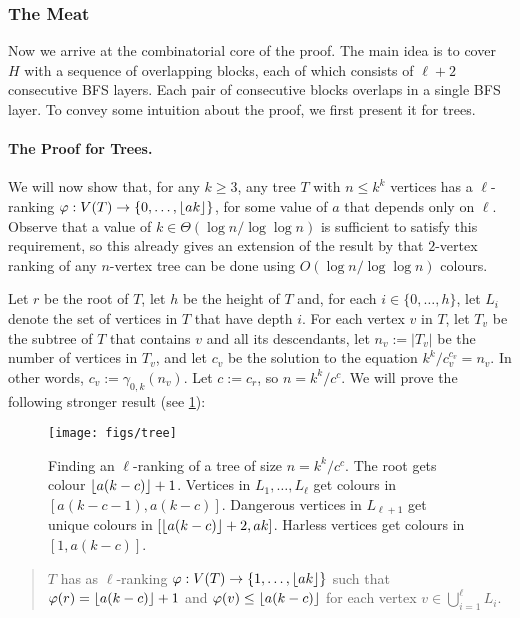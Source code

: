 \documentclass[kpfonts]{patmorin}
\theoremstyle{named}
\begin{document}
\subsubsection{The Meat}

Now we arrive at the combinatorial core of the proof. The main idea is to cover $H$ with a sequence of overlapping blocks, each of which consists of $\ell+2$ consecutive BFS layers.  Each pair of consecutive blocks overlaps in a single BFS layer. To convey some intuition about the proof, we first present it for trees.

\paragraph{The Proof for Trees.}

We will now show that, for any $k\ge 3$, any tree $T$ with $n \le k^k$ vertices has a $\ell$-ranking $\varphi:V(T)\to\{0,\ldots,{\lfloor ak \rfloor}\}$, for some value of $a$ that depends only on $\ell$.  Observe that a value of $k\in\Theta(\log n/\log\log n)$ is sufficient to satisfy this requirement, so this already gives an extension of the result by \citet{karpas.neiman.ea:on} that $2$-vertex ranking of any $n$-vertex tree can be done using $O(\log n/\log\log n)$ colours.

Let $r$ be the root of $T$, let $h$ be the height of $T$ and, for each $i\in\{0,\ldots,h\}$, let $L_i$ denote the set of vertices in $T$ that have depth $i$.  For each vertex $v$ in $T$, let $T_v$ be the subtree of $T$ that contains $v$ and all its descendants, let $n_v:=|T_v|$ be the number of vertices in $T_v$, and let $c_v$ be the solution to the equation $k^k/c_v^{c_v} = n_v$.  In other words, $c_v:=\gamma_{0,k}(n_v)$.  Let $c:=c_r$, so $n=k^k/c^c$.  We will prove the following stronger result (see \cref{tree_fig}):

\begin{figure}
  \begin{center}
    \texttt{[image: figs/tree]}
  \end{center}
  \caption{Finding an $\ell$-ranking of a tree of size $n=k^k/c^c$.  The root gets colour ${\lfloor a(k-c) \rfloor}+1$. Vertices in $L_1,\ldots,L_{\ell}$ get colours in $[a(k-c-1),a(k-c)]$.  Dangerous vertices in $L_{\ell+1}$ get unique colours in $[{\lfloor a(k-c) \rfloor}+2,ak]$.  Harless vertices get colours in $[1,a(k-c)]$.}
  \label{tree_fig} 
\end{figure}

\begin{quote}
    $T$ has as $\ell$-ranking $\varphi:V(T)\to\{1,\ldots,{\lfloor ak \rfloor}\}$ such that $\varphi(r)={\lfloor a(k-c) \rfloor}+1$ and $\varphi(v)\le {\lfloor a(k-c) \rfloor}$ for each vertex $v\in\bigcup_{i=1}^\ell L_i$.
\end{quote}
\end{document}
